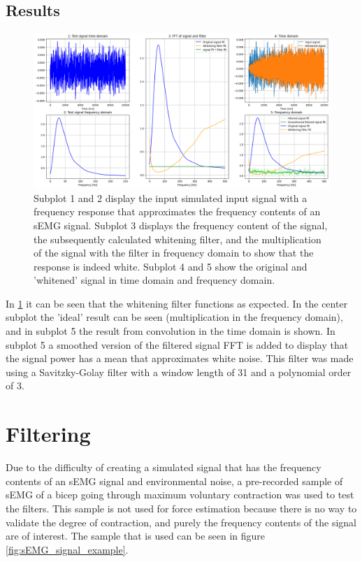 \subsection{Results}
\begin{figure}[h!t]
	\begin{center}
		\includegraphics[width=1.0\columnwidth]{images/prewhitening_simulation.png}
	\end{center}
	\caption{Subplot 1 and 2 display the input simulated input signal with a frequency response that approximates the frequency contents of an sEMG signal. Subplot 3 displays the frequency content of the signal, the subsequently calculated whitening filter, and the multiplication of the signal with the filter in frequency domain to show that the response is indeed white. Subplot 4 and 5 show the original and 'whitened' signal in time domain and frequency domain.}
	\label{fig:whitening_simulation}
\end{figure}

In \ref{fig:whitening_simulation} it can be seen that the whitening filter functions as expected. In the center subplot the 'ideal' result can be seen (multiplication in the frequency domain), and in subplot 5 the result from convolution in the time domain is shown. In subplot 5 a smoothed version of the filtered signal FFT is added to display that the signal power has a mean that approximates white noise. This filter was made using a Savitzky-Golay filter with a window length of 31 and a polynomial order of 3.

\section{Filtering}
Due to the difficulty of creating a simulated signal that has the frequency contents of an sEMG signal and environmental noise, a pre-recorded sample of sEMG of a bicep going through maximum voluntary contraction was used to test the filters. This sample is not used for force estimation because there is no way to validate the degree of contraction, and purely the frequency contents of the signal are of interest. The sample that is used can be seen in figure \ref{fig:sEMG_signal_example}. 

